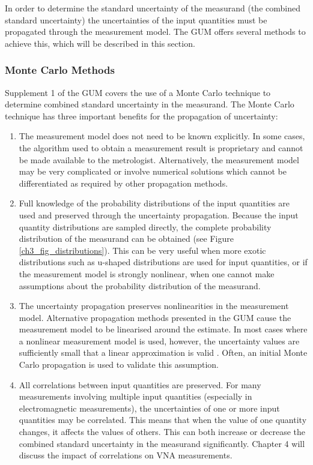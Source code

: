 \documentclass[../thesis/thesis.tex]{subfiles}
\begin{document}
\begin{refsection}
In order to determine the standard uncertainty of the measurand (the combined standard uncertainty) the uncertainties of the input quantities must be propagated through the measurement model. The GUM offers several methods to achieve this, which will be described in this section.

\subsubsection{Monte Carlo Methods}

Supplement 1 of the GUM \cite{GUM_S1} covers the use of a Monte Carlo technique to determine combined standard uncertainty in the measurand. The Monte Carlo technique has three important benefits for the propagation of uncertainty:

\begin{enumerate}
	\item The measurement model does not need to be known explicitly. In some cases, the algorithm used to obtain a measurement result is proprietary and cannot be made available to the metrologist. Alternatively, the measurement model may be very complicated or involve numerical solutions which cannot be differentiated as required by other propagation methods.
	\item Full knowledge of the probability distributions of the input quantities are used and preserved through the uncertainty propagation. Because the input quantity distributions are sampled directly, the complete probability distribution of the measurand can be obtained (see Figure \ref{ch3_fig_distributions}). This can be very useful when more exotic distributions such as u-shaped distributions are used for input quantities, or if the measurement model is strongly nonlinear, when one cannot make assumptions about the probability distribution of the measurand.
	\item The uncertainty propagation preserves nonlinearities in the measurement model. Alternative propagation methods presented in the GUM cause the measurement model to be linearised around the estimate. In most cases where a nonlinear measurement model is used, however, the uncertainty values are sufficiently small that a linear approximation is valid \cite[5.1.5]{GUM_2008}. Often, an initial Monte Carlo propagation is used to validate this assumption.
	\item All correlations between input quantities are preserved. For many measurements involving multiple input quantities (especially in electromagnetic measurements), the uncertainties of one or more input quantities may be correlated. This means that when the value of one quantity changes, it affects the values of others. This can both increase or decrease the combined standard uncertainty in the measurand significantly. Chapter 4 will discuss the impact of correlations on VNA measurements.
\end{enumerate}


\end{refsection}
\end{document}
